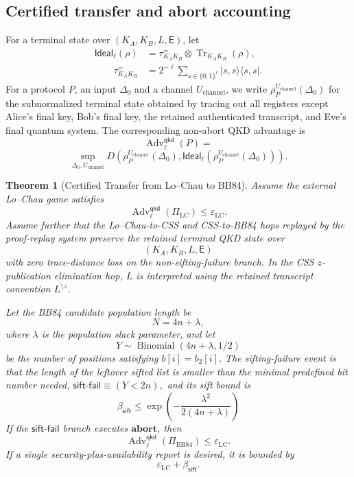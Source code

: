 \documentclass[conference,compsoc]{IEEEtran}
\providecommand{\ket}[1]{\lvert #1\rangle}
\providecommand{\bra}[1]{\langle #1\rvert}
\newcommand{\bb}{\textsf{BB84}\xspace}
\newcommand{\Ideal}{\mathsf{Ideal}}
\newcommand{\Tr}{\operatorname{Tr}}
\newtheorem{theorem}{Theorem}
\begin{document}
\subsection{Certified transfer and abort accounting}

For a terminal state over \((K_A,K_B,L,\mathsf E)\), let
\[\begin{aligned}
    \Ideal_{\ell}(\rho)
    &=
    \tau^{=}_{K_AK_B}\otimes\Tr_{K_AK_B}(\rho),\\
    \qquad
    \tau^{=}_{K_AK_B}
    &=
    2^{-\ell}\sum_{s\in\{0,1\}^{\ell}}\ket{s,s}\bra{s,s}.
\end{aligned}
\] 
For a protocol \(P\), an input \(\Delta_0\) and a channel
\(U_{\mathrm{channel}}\), we write
\(\rho_{P}^{U_{\mathrm{channel}}}(\Delta_0)\) for the subnormalized terminal
state obtained by tracing out all registers except Alice's final key, Bob's
final key, the retained authenticated transcript, and Eve's final quantum
system. The corresponding non-abort QKD advantage is
\[
\operatorname{Adv}^{\mathsf{qkd}}_{\ell}(P)
=\]\[
\sup_{\Delta_0,U_{\mathrm{channel}}} D\!\left(
  \rho_{P}^{U_{\mathrm{channel}}}(\Delta_0),
  \Ideal_{\ell}\!\left(
    \rho_{P}^{U_{\mathrm{channel}}}(\Delta_0)
  \right)
\right).
\]

\begin{theorem}[Certified Transfer from Lo--Chau to \bb]
\label{thm:certified-transfer-lc-bb84}
Assume the external Lo--Chau game satisfies
\[
\operatorname{Adv}^{\mathsf{qkd}}_{\ell}(\Pi_{\mathrm{LC}})
\le
\varepsilon_{\mathrm{LC}} .
\]
Assume further that the Lo--Chau-to-CSS and CSS-to-\bb hops replayed by the
proof-replay system preserve the retained terminal QKD state over
\[
(K_A,K_B,L,\mathsf E)
\]
with zero trace-distance loss on the non-sifting-failure branch. In the CSS
\(z\)-publication elimination hop, \(L\) is interpreted using the retained
transcript convention \(L^{\setminus z}\).

Let the \bb candidate population length be
\[
N=4n+\lambda,
\]
where \(\lambda\) is the population slack parameter, and let
\[
Y\sim\operatorname{Binomial}(4n+\lambda,1/2)
\]
be the number of positions satisfying \(b[i]=b_2[i]\). The sifting-failure
event is that the length of the leftover sifted list is smaller than the
minimal predefined bit number needed,
\(
\mathsf{sift\mbox{-}fail}\equiv (Y<2n),
\)
and its sift bound is
\[
\beta_{\mathsf{sift}}
\le
\exp\!\left(
  -\frac{\lambda^2}{2(4n+\lambda)}
\right)
\]
If the \(\mathsf{sift\mbox{-}fail}\) branch executes
\(\mathbf{abort}\), then
\[
\operatorname{Adv}^{\mathsf{qkd}}_{\ell}(\Pi_{\mathrm{BB84}})
\le
\varepsilon_{\mathrm{LC}} .
\]
If a single security-plus-availability report is desired, it is bounded by
\[
\varepsilon_{\mathrm{LC}}+\beta_{\mathsf{sift}}.
\]
\end{theorem}
\end{document}
